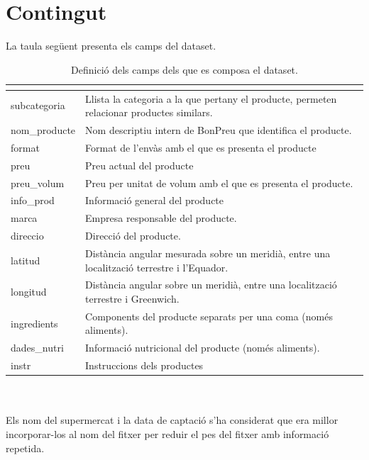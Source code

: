 \documentclass[]{scrartcl}
\begin{document}
\section{Contingut}
La taula següent presenta els camps del dataset.
\begin{table}[!h]
	\centering
	\resizebox{17cm}{!} {
	\begin{tabular}{|l|l|}
		\hline
		\rowcolor[HTML]{000078} 
		\multicolumn{1}{|c|}{\cellcolor[HTML]{000078}{\color[HTML]{FFFFFF} \textbf{Camp}}} &
		\multicolumn{1}{c|}{\cellcolor[HTML]{000078}{\color[HTML]{FFFFFF} \textbf{Descripció}}} \\ \hline
		subcategoria       & Llista la categoria a la que pertany el producte, permeten relacionar productes similars. \\ \hline
		nom\_producte & Nom descriptiu intern de BonPreu que identifica el producte. \\ \hline
		format  & Format de l'envàs amb el que es presenta el producte \\ \hline
		preu       & Preu actual del producte \\ \hline
		preu\_volum & Preu per unitat de volum amb el que es presenta el producte. \\ \hline
		info\_prod  & Informació general del producte \\ \hline
		marca  & Empresa responsable del producte. \\ \hline
		direccio       & Direcció del producte. \\ \hline
		latitud & Distància angular mesurada sobre un meridià, entre una localització terrestre i l'Equador. \\ \hline
		longitud  &  Distància angular sobre un meridià, entre una localització terrestre i Greenwich.\\ \hline
		ingredients       & Components del producte separats per una coma (només aliments). \\ \hline
		dades\_nutri & Informació nutricional del producte (només aliments). \\ \hline
		instr  & Instruccions dels productes \\ \hline
	\end{tabular}
	}
	\caption{Definició dels camps dels que es composa el dataset.}
	\label{tab:Taula de contribucions}
\end{table}
\\\\Els nom del supermercat i la data de captació s'ha considerat que era millor incorporar-los al nom del fitxer per reduir el pes del fitxer amb informació repetida.
\end{document}
